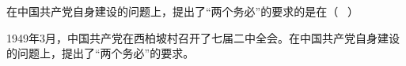 \question 在中国共产党自身建设的问题上，提出了``两个务必''的要求的是在（ ~）
\par{}
\begin{solution}1949年3月，中国共产党在西柏坡村召开了七届二中全会。在中国共产党自身建设的问题上，提出了``两个务必''的要求。
\end{solution}
